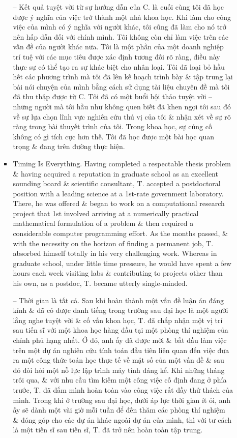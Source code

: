 \documentclass{article}
\begin{document}
\begin{enumerate}
\begin{itemize}
\begin{itemize}
			-- Kết quả tuyệt vời từ sự hướng dẫn của C. là cuối cùng tôi đã học được ý nghĩa của việc trở thành một nhà khoa học. Khi làm cho công việc của mình có ý nghĩa với người khác, tôi cũng đã làm cho nó trở nên hấp dẫn đối với chính mình. Tôi không còn chỉ làm việc trên các vấn đề của người khác nữa. Tôi là một phần của một doanh nghiệp trí tuệ với các mục tiêu được xác định tương đối rõ ràng, điều này thực sự có thể tạo ra sự khác biệt cho nhân loại. Tôi đã loại bỏ hầu hết các phương trình mà tôi đã lên kế hoạch trình bày \& tập trung lại bài nói chuyện của mình bằng cách sử dụng tài liệu chuyên đề mà tôi đã thu thập được từ C. Tôi đã có một buổi hội thảo tuyệt vời -- những người mà tôi hầu như không quen biết đã khen ngợi tôi sau đó về sự lựa chọn lĩnh vực nghiên cứu thú vị của tôi \& nhận xét về sự rõ ràng trong bài thuyết trình của tôi. Trong khoa học, sự củng cố không có gì tích cực hơn thế. Tôi đã học được một bài học quan trọng \& đang trên đường thực hiện.
			\item {\sf Timing Is Everything.} Having completed a respectable thesis problem \& having acquired a reputation in graduate school as an excellent sounding board \& scientific consultant, T. accepted a postdoctoral position with a leading science at a 1st-rate government laboratory. There, he was offered \& began to work on a computational research project that 1st involved arriving at a numerically practical mathematical formulation of a problem \& then required a considerable computer programming effort. As the months passed, \& with the necessity on the horizon of finding a permanent job, T. absorbed himself totally in his very challenging work. Whereas in graduate school, under little time pressure, he would have spent a few hours each week visiting labs \& contributing to projects other than his own, as a postdoc, T. became utterly single-minded.
			
			-- {\sf Thời gian là tất cả.} Sau khi hoàn thành một vấn đề luận án đáng kính \& đã có được danh tiếng trong trường sau đại học là một người lắng nghe tuyệt vời \& cố vấn khoa học, T. đã chấp nhận một vị trí sau tiến sĩ với một khoa học hàng đầu tại một phòng thí nghiệm của chính phủ hạng nhất. Ở đó, anh ấy đã được mời \& bắt đầu làm việc trên một dự án nghiên cứu tính toán đầu tiên liên quan đến việc đưa ra một công thức toán học thực tế về mặt số của một vấn đề \& sau đó đòi hỏi một nỗ lực lập trình máy tính đáng kể. Khi những tháng trôi qua, \& với nhu cầu tìm kiếm một công việc cố định đang ở phía trước, T. đã đắm mình hoàn toàn vào công việc rất đầy thử thách của mình. Trong khi ở trường sau đại học, dưới áp lực thời gian ít ỏi, anh ấy sẽ dành một vài giờ mỗi tuần để đến thăm các phòng thí nghiệm \& đóng góp cho các dự án khác ngoài dự án của mình, thì với tư cách là một tiến sĩ sau tiến sĩ, T. đã trở nên hoàn toàn tập trung.
			

\end{itemize}
\end{itemize}
\end{enumerate}
\end{document}
